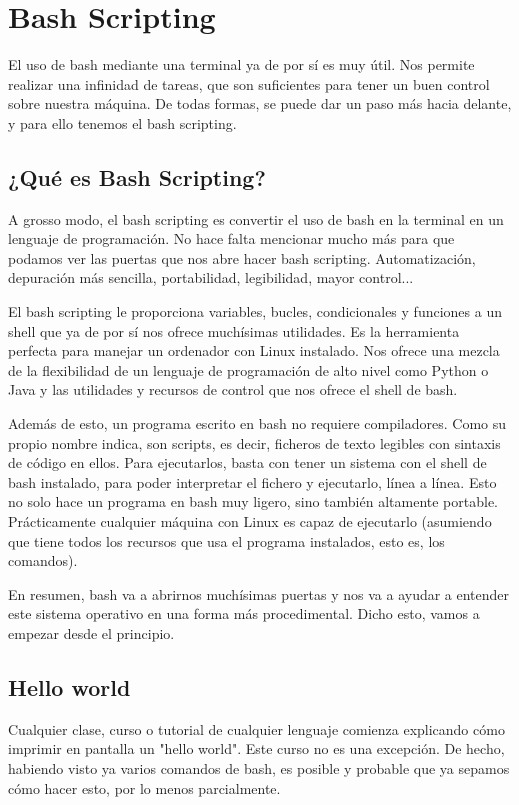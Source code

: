 \chapter{Bash Scripting}
El uso de bash mediante una terminal ya de por sí es muy útil. Nos permite realizar una infinidad de tareas, que son suficientes para tener un buen control sobre nuestra máquina. De todas formas, se puede dar un paso más hacia delante, y para ello tenemos el bash scripting.

\section{¿Qué es Bash Scripting?}
A grosso modo, el bash scripting es convertir el uso de bash en la terminal en un lenguaje de programación. No hace falta mencionar mucho más para que podamos ver las puertas que nos abre hacer bash scripting. Automatización, depuración más sencilla, portabilidad, legibilidad, mayor control...

El bash scripting le proporciona variables, bucles, condicionales y funciones a un shell que ya de por sí nos ofrece muchísimas utilidades. Es la herramienta perfecta para manejar un ordenador con Linux instalado. Nos ofrece una mezcla de la flexibilidad de un lenguaje de programación de alto nivel como Python o Java y las utilidades y recursos de control que nos ofrece el shell de bash. 

Además de esto, un programa escrito en bash no requiere compiladores. Como su propio nombre indica, son scripts, es decir, ficheros de texto legibles con sintaxis de código en ellos. Para ejecutarlos, basta con tener un sistema con el shell de bash instalado, para poder interpretar el fichero y ejecutarlo, línea a línea. Esto no solo hace un programa en bash muy ligero, sino también altamente portable. Prácticamente cualquier máquina con Linux es capaz de ejecutarlo (asumiendo que tiene todos los recursos que usa el programa instalados, esto es, los comandos).

En resumen, bash va a abrirnos muchísimas puertas y nos va a ayudar a entender este sistema operativo en una forma más procedimental. Dicho esto, vamos a empezar desde el principio.

\section{Hello world}
Cualquier clase, curso o tutorial de cualquier lenguaje comienza explicando cómo imprimir en pantalla un "hello world". Este curso no es una excepción. De hecho, habiendo visto ya varios comandos de bash, es posible y probable que ya sepamos cómo hacer esto, por lo menos parcialmente.

